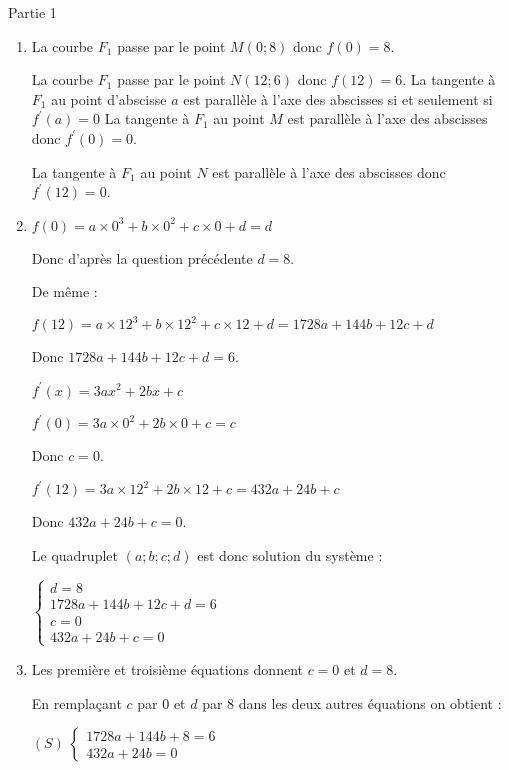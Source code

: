 \begin{corrige}
     \begin{h3}Partie 1\end{h3}
     \begin{enumerate}
          \item
          La courbe $F_1$ passe par le point $M(0;8)$ donc $f(0)=8$.
          \par
          La courbe $F_1$ passe par le point $N(12;6)$ donc $f(12)=6$.
La tangente à $F_1$ au point d'abscisse $a$ est parallèle à l'axe des abscisses si et seulement si  $f ^{\prime}(a)=0$
     La tangente à $F_1$ au point $M$ est parallèle à l'axe des abscisses donc $f ^{\prime}(0)=0$.
     \par
     La tangente à $F_1$ au point $N$ est parallèle à l'axe des abscisses donc $f ^{\prime}(12)=0$.
     \item
     $f(0)=a\times 0^3+b \times 0^2+c \times 0+d=d$
     \par
     Donc d'après la question précédente $d=8$.
     \par
     De même :
     \par
     $f(12)=a\times 12^3+b \times 12^2+c \times 12+d$$=1728a+144b+12c+d$
     \par
     Donc  $1728a+144b+12c+d=6$.
     \par
     $f ^{\prime}(x)=3ax^2+2bx+c$
     \par
     $f ^{\prime}(0)=3a \times 0^2+2b \times 0+c=c$
     \par
     Donc $c=0$.
     \par
     $f ^{\prime}(12)=3a \times 12^2+2b \times 12+c=432a+24b+c$
     \par
     Donc $432a+24b+c=0$.
     \par
     Le quadruplet $(a;b;c;d)$ est donc solution du système :
     \par
     $\begin{cases}  d=8 \\ 1728a+144b+12c+d=6 \\ c=0 \\   432a+24b+c=0 \end{cases}$
     \item
     Les première et troisième équations donnent $c=0$ et $d=8$.
     \par
     En remplaçant $c$ par $0$ et $d$ par $8$ dans les deux autres équations on obtient :
     \par
     $(S) \ \begin{cases} 1728a+144b+8=6 \\ 432a+24b=0  \end{cases}$
$$
\end{enumerate}
\end{corrige}
